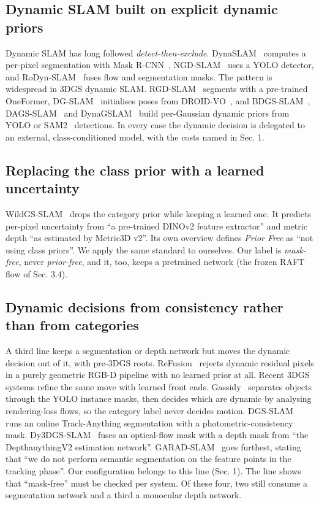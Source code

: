 \subsection{Dynamic SLAM built on explicit dynamic priors}


Dynamic SLAM has long followed \emph{detect-then-exclude}. DynaSLAM~\cite{dynaslam} computes a per-pixel segmentation with Mask R-CNN~\cite{maskrcnn}, NGD-SLAM~\cite{ngdslam} uses a YOLO detector, and RoDyn-SLAM~\cite{rodynslam} fuses flow and segmentation masks. The pattern is widespread in 3DGS dynamic SLAM. RGD-SLAM~\cite{rgdslam} segments with a pre-trained OneFormer, DG-SLAM~\cite{dgslam} initialises poses from DROID-VO~\cite{droidslam}, and BDGS-SLAM~\cite{bdgsslam}, DAGS-SLAM~\cite{dagsslam} and DynaGSLAM~\cite{dynagslam} build per-Gaussian dynamic priors from YOLO or SAM2~\cite{sam2} detections. In every case the dynamic decision is delegated to an external, class-conditioned model, with the costs named in Sec. 1.


\subsection{Replacing the class prior with a learned uncertainty}


WildGS-SLAM~\cite{wildgsslam} drops the category prior while keeping a learned one. It predicts per-pixel uncertainty from ``a pre-trained DINOv2 feature extractor'' and metric depth ``as estimated by Metric3D v2''. Its own overview defines \emph{Prior Free} as ``not using class priors''. We apply the same standard to ourselves. Our label is \emph{mask-free}, never \emph{prior-free}, and it, too, keeps a pretrained network (the frozen RAFT flow of Sec. 3.4).


\subsection{Dynamic decisions from consistency rather than from categories}


A third line keeps a segmentation or depth network but moves the dynamic decision out of it, with pre-3DGS roots. ReFusion~\cite{bonn} rejects dynamic residual pixels in a purely geometric RGB-D pipeline with no learned prior at all. Recent 3DGS systems refine the same move with learned front ends. Gassidy~\cite{gassidy} separates objects through the YOLO instance masks, then decides which are dynamic by analysing rendering-loss flows, so the category label never decides motion. DGS-SLAM~\cite{dgsslamkong} runs an online Track-Anything segmentation with a photometric-consistency mask. Dy3DGS-SLAM~\cite{dy3dgsslam} fuses an optical-flow mask with a depth mask from ``the DepthanythingV2 estimation network''. GARAD-SLAM~\cite{garadslam} goes furthest, stating that ``we do not perform semantic segmentation on the feature points in the tracking phase''. Our configuration belongs to this line (Sec. 1). The line shows that ``mask-free'' must be checked per system. Of these four, two still consume a segmentation network and a third a monocular depth network.


